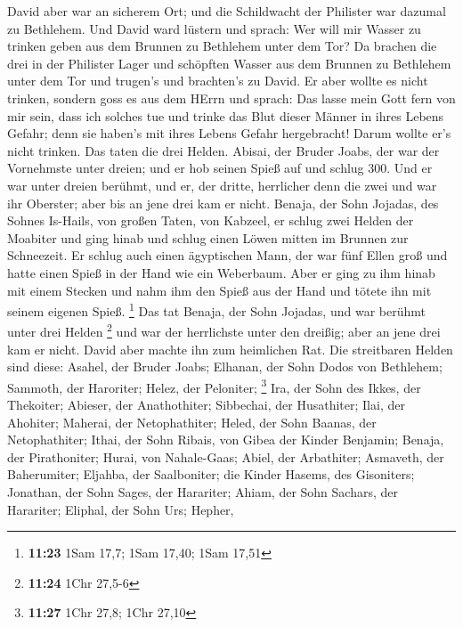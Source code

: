 David aber war an sicherem Ort; und die Schildwacht der Philister war
dazumal zu Bethlehem.  Und David ward lüstern und sprach:
Wer will mir Wasser zu trinken geben aus dem Brunnen zu Bethlehem unter
dem Tor?  Da brachen die drei in der Philister Lager und
schöpften Wasser aus dem Brunnen zu Bethlehem unter dem Tor und trugen's
und brachten's zu David. Er aber wollte es nicht trinken, sondern goss
es aus dem HErrn  und sprach: Das lasse mein Gott fern
von mir sein, dass ich solches tue und trinke das Blut dieser Männer in
ihres Lebens Gefahr; denn sie haben's mit ihres Lebens Gefahr
hergebracht! Darum wollte er's nicht trinken. Das taten die drei Helden.
 Abisai, der Bruder Joabs, der war der Vornehmste unter
dreien; und er hob seinen Spieß auf und schlug 300. Und er war unter
dreien berühmt,  und er, der dritte, herrlicher denn die
zwei und war ihr Oberster; aber bis an jene drei kam er nicht.
 Benaja, der Sohn Jojadas, des Sohnes Is-Hails, von
großen Taten, von Kabzeel, er schlug zwei Helden der Moabiter und ging
hinab und schlug einen Löwen mitten im Brunnen zur Schneezeit.
 Er schlug auch einen ägyptischen Mann, der war fünf
Ellen groß und hatte einen Spieß in der Hand wie ein Weberbaum. Aber er
ging zu ihm hinab mit einem Stecken und nahm ihm den Spieß aus der Hand
und tötete ihn mit seinem eigenen Spieß. \footnote{\textbf{11:23} 1Sam
  17,7; 1Sam 17,40; 1Sam 17,51}  Das tat Benaja, der Sohn
Jojadas, und war berühmt unter drei Helden \footnote{\textbf{11:24} 1Chr
  27,5-6}  und war der herrlichste unter den dreißig;
aber an jene drei kam er nicht. David aber machte ihn zum heimlichen
Rat.  Die streitbaren Helden sind diese: Asahel, der
Bruder Joabs; Elhanan, der Sohn Dodos von Bethlehem; 
Sammoth, der Haroriter; Helez, der Peloniter; \footnote{\textbf{11:27}
  1Chr 27,8; 1Chr 27,10}  Ira, der Sohn des Ikkes, der
Thekoiter; Abieser, der Anathothiter;  Sibbechai, der
Husathiter; Ilai, der Ahohiter;  Maherai, der
Netophathiter; Heled, der Sohn Baanas, der Netophathiter;
 Ithai, der Sohn Ribais, von Gibea der Kinder Benjamin;
Benaja, der Pirathoniter;  Hurai, von Nahale-Gaas; Abiel,
der Arbathiter;  Asmaveth, der Baherumiter; Eljahba, der
Saalboniter;  die Kinder Hasems, des Gisoniters;
Jonathan, der Sohn Sages, der Harariter;  Ahiam, der Sohn
Sachars, der Harariter; Eliphal, der Sohn Urs;  Hepher,
